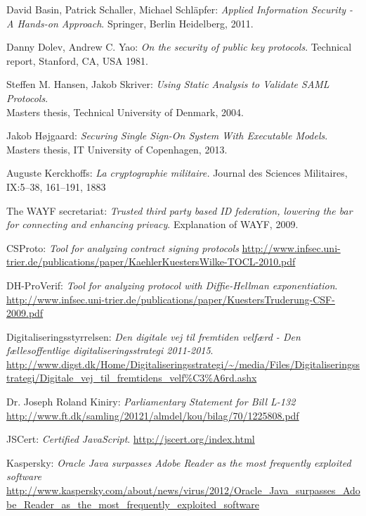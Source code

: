 \documentclass[twosided]{report}
\begin{document}
\begin{thebibliography}{9}

  David Basin, Patrick Schaller, Michael Schl{\"a}pfer:
  \emph{Applied Information Security - A Hands-on Approach}.
  Springer, Berlin Heidelberg,
  2011.

 Danny Dolev, Andrew C. Yao:
 \emph{On the security of public key protocols}.
 Technical report, Stanford, CA, USA
 1981.

  Steffen M. Hansen, Jakob Skriver:
  \emph{Using Static Analysis to Validate SAML Protocols}.
  \\Masters thesis, Technical University of Denmark,
  2004.

  Jakob H{\o}jgaard:
  \emph{Securing Single Sign-On System With Executable Models}.
  Masters thesis, IT University of Copenhagen,
  2013.

 Auguste Kerckhoffs:
 \emph{La cryptographie militaire.}
 Journal des Sciences Militaires, IX:5–38, 161–191, 1883

 The WAYF secretariat:
 \emph{Trusted third party based ID federation, lowering the bar for connecting and enhancing privacy}.
 Explanation of WAYF, 2009.

 CSProto:
 \emph{Tool for analyzing contract signing protocols}
 \url{http://www.infsec.uni-trier.de/publications/paper/KaehlerKuestersWilke-TOCL-2010.pdf}

 DH-ProVerif:
 \emph{Tool for analyzing protocol with Diffie-Hellman exponentiation}.
 \url{http://www.infsec.uni-trier.de/publications/paper/KuestersTruderung-CSF-2009.pdf}

 Digitaliseringsstyrrelsen:
 \emph{Den digitale vej til fremtiden velf{\ae}rd - Den f{\ae}llesoffentlige digitaliseringsstrategi 2011-2015}.
 \url{http://www.digst.dk/Home/Digitaliseringsstrategi/~/media/Files/Digitaliseringsstrategi/Digitale_vej_til_fremtidens_velf\%C3\%A6rd.ashx}

 Dr. Joseph Roland Kiniry:
 \emph{Parliamentary Statement for Bill L-132}
 \url{http://www.ft.dk/samling/20121/almdel/kou/bilag/70/1225808.pdf}

 JSCert:
 \emph{Certified JavaScript}.
 \url{http://jscert.org/index.html}

 Kaspersky:
 \emph{Oracle Java surpasses Adobe Reader as the most frequently exploited software}
 \url{http://www.kaspersky.com/about/news/virus/2012/Oracle_Java_surpasses_Adobe_Reader_as_the_most_frequently_exploited_software}


\end{thebibliography}
\end{document}

